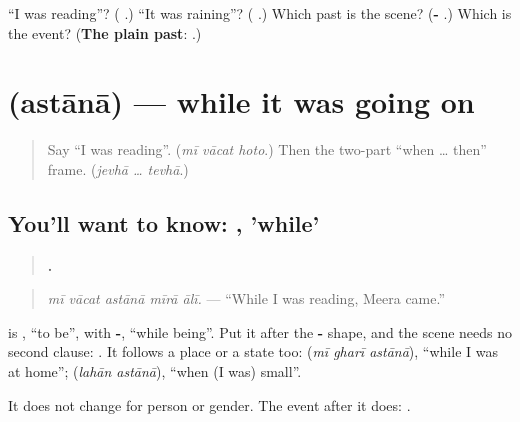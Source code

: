 \begin{tcolorbox}[breakable,colback=teal!4,colframe=teal!35!black,title={Before you move on}]
\textquotedblleft{}I was reading\textquotedblright{}? (\textbf{  }.) \textquotedblleft{}It was raining\textquotedblright{}? (\textbf{  }.) Which past is the scene? (\textbf{- }.) Which is the event? (\textbf{The plain past}: \textbf{}.)
\end{tcolorbox}
\section[\texorpdfstring{\mr{असताना} (astānā)}{असताना (astānā)}]{ (astānā) — while it was going on}

\label{lesson:MR-C278-astana}



\begin{quote}
Say \textquotedblleft{}I was reading\textquotedblright{}. (\emph{mī vācat hoto}.) Then the two-part \textquotedblleft{}when … then\textquotedblright{} frame. (\emph{jevhā … tevhā}.)
\end{quote}

\subsection*{You'll want to know: , 'while'}
\begin{quote}
\textbf{    .}
\end{quote}

\begin{quote}
\emph{mī vācat astānā mīrā ālī.} — \textquotedblleft{}While I was reading, Meera came.\textquotedblright{}
\end{quote}

\textbf{} is \textbf{}, \textquotedblleft{}to be\textquotedblright{}, with \textbf{-}, \textquotedblleft{}while being\textquotedblright{}. Put it after the \textbf{-} shape, and the scene needs no second clause: \textbf{  }. It follows a place or a state too: \textbf{  } (\emph{mī gharī astānā}), \textquotedblleft{}while I was at home\textquotedblright{}; \textbf{ } (\emph{lahān astānā}), \textquotedblleft{}when (I was) small\textquotedblright{}.

It does not change for person or gender. The event after it does: \textbf{ }.

